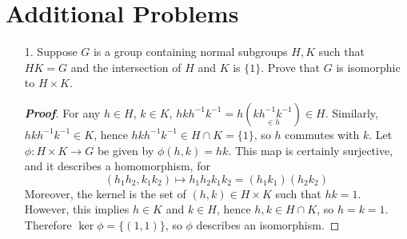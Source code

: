 \documentclass[12pt,leqno]{book}
\theoremstyle{definition}
\newenvironment{Proof}{\begin{proof}[\textnormal{\textbf{Proof}}]}{\end{proof}}
\begin{document}
\section*{Additional Problems}
\begin{enumerate}
 \item [1.] Suppose $G$ is a group containing normal subgroups $H,K$ such that $HK=G$ and the intersection of $H$ and $K$ is $\{1\}$. Prove that $G$ is isomorphic to $H\times K$. 
  \begin{Proof}
   For any $h\in H$, $k\in K$, $hkh^{-1}k^{-1}=h(\underset{\in h}{kh^{-1}k^{-1}})\in H$. Similarly, $hkh^{-1}k^{-1}\in K$, hence $hkh^{-1}k^{-1}\in H\cap K=\{1\}$, so $h$ commutes with $k$. Let $\phi:H\times K\to G$ be given by $\phi(h,k)=hk$. This map is certainly surjective, and it describes a homomorphism, for \[(h_1h_2,k_1k_2)\mapsto h_1h_2k_1k_2=(h_1k_1)(h_2k_2)\] Moreover, the kernel is the set of $(h,k)\in H\times K$ such that $hk=1$. However, this implies $h\in K$ and $k\in H$, hence $h,k\in H\cap K$, so $h=k=1$. Therefore $\ker\phi=\{(1,1)\}$, so $\phi$ describes an isomorphism.
  \end{Proof}

\end{enumerate}
\end{document}
